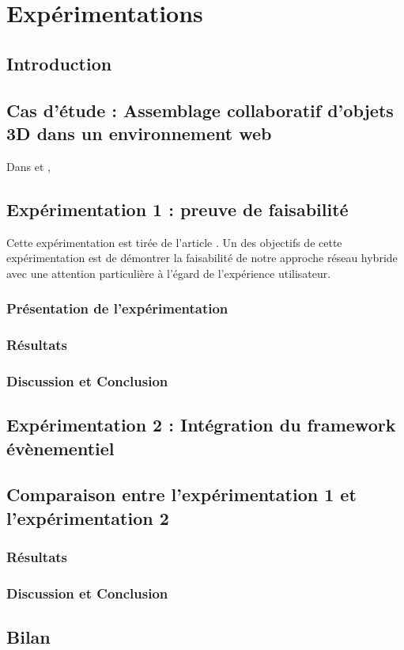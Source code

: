 \chapter{Expérimentations}
\chaptertable

\section{Introduction}
\section{Cas d'étude : Assemblage collaboratif d'objets 3D dans un 
environnement web}
Dans \cite{Desprat2015a} et \cite{Desprat2017}, 


\section{Expérimentation 1 : preuve de faisabilité}
Cette expérimentation est tirée de l'article \cite{Desprat2015a}.
Un des objectifs de cette expérimentation est de démontrer la faisabilité de notre 
approche réseau hybride avec une attention particulière à l'égard de l'expérience 
utilisateur.
\subsection{Présentation de l'expérimentation}

\subsection{Résultats}
\subsection{Discussion et Conclusion}


\section{Expérimentation 2 : Intégration du framework évènementiel}
\label{sec:us}






\section{Comparaison entre l'expérimentation 1 et l'expérimentation 2}
\subsection{Résultats}
\subsection{Discussion et Conclusion}
\section{Bilan}